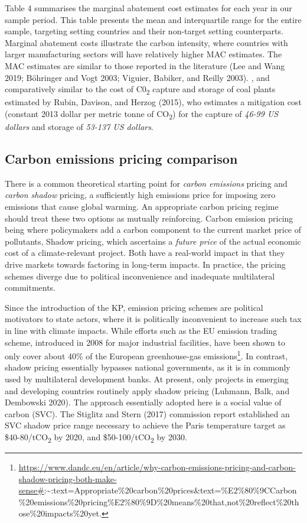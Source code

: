 \documentclass[
  10pt,
]{article}
\begin{document}
Table 4 summarises the marginal abatement cost estimates for each year
in our sample period. This table presents the mean and interquartile
range for the entire sample, targeting setting countries and their
non-target setting counterparts. Marginal abatement costs illustrate the
carbon intensity, where countries with larger manufacturing sectors will
have relatively higher MAC estimates. The MAC estimates are similar to
those reported in the literature (Lee and Wang 2019; Böhringer and Vogt
2003; Viguier, Babiker, and Reilly 2003). , and comparatively similar to
the cost of C0\textsubscript{2} capture and storage of coal plants
estimated by Rubin, Davison, and Herzog (2015), who estimates a
mitigation cost (constant 2013 dollar per metric tonne of
CO\textsubscript{2}) for the capture of \emph{46-99 US dollars} and
storage of \emph{53-137 US dollars}.

\hypertarget{carbon-emissions-pricing-comparison}{%
\subsection{Carbon emissions pricing
comparison}\label{carbon-emissions-pricing-comparison}}

There is a common theoretical starting point for \emph{carbon emissions}
pricing and \emph{carbon shadow} pricing, a sufficiently high emissions
price for imposing zero emissions that cause global warming. An
appropriate carbon pricing regime should treat these two options as
mutually reinforcing. Carbon emission pricing being where policymakers
add a carbon component to the current market price of pollutants, Shadow
pricing, which ascertains a \emph{future price} of the actual economic
cost of a climate-relevant project. Both have a real-world impact in
that they drive markets towards factoring in long-term impacts. In
practice, the pricing schemes diverge due to political inconvenience and
inadequate multilateral commitments.

Since the introduction of the KP, emission pricing schemes are political
motivators to state actors, where it is politically inconvenient to
increase such tax in line with climate impacts. While efforts such as
the EU emission trading scheme, introduced in 2008 for major industrial
facilities, have been shown to only cover about 40\% of the European
greenhouse-gas emissions\footnote{\url{https://www.dandc.eu/en/article/why-carbon-emissions-pricing-and-carbon-shadow-pricing-both-make-sense\#}:\textasciitilde:text=Appropriate\%20carbon\%20prices\&text=\%E2\%80\%9CCarbon\%20emissions\%20pricing\%E2\%80\%9D\%20means\%20that,not\%20reflect\%20those\%20impacts\%20yet.}.
In contrast, shadow pricing essentially bypasses national governments,
as it is in commonly used by multilateral development banks. At present,
only projects in emerging and developing countries routinely apply
shadow pricing (Luhmann, Balk, and Dembowski 2020). The approach
essentially adopted here is a social value of carbon (SVC). The Stiglitz
and Stern (2017) commission report established an SVC shadow price range
necessary to achieve the Paris temperature target as
\$40-80/tCO\textsubscript{2} by 2020, and \$50-100/tCO\textsubscript{2}
by 2030.
\end{document}
